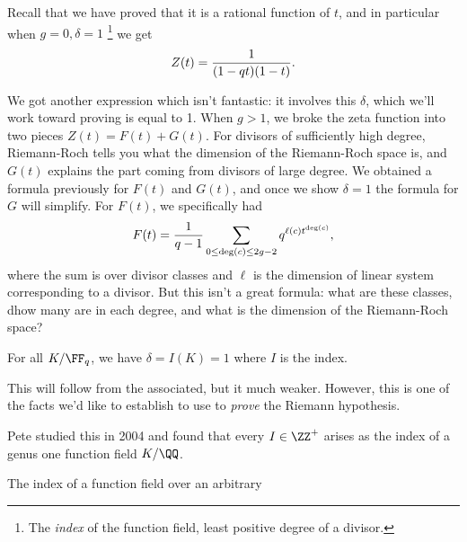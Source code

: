 \begin{remark}

Recall that we have proved that it is a rational function of \(t\), and
in particular when \(g=0, \delta = 1\) \footnote{The \emph{index} of the
  function field, least positive degree of a divisor.} we get
\begin{align*}  
Z(t) = {1 \over (1-qt)(1-t)}
.\end{align*}

We got another expression which isn't fantastic: it involves this
\(\delta\), which we'll work toward proving is equal to 1. When \(g>1\),
we broke the zeta function into two pieces \(Z(t) = F(t) + G(t)\). For
divisors of sufficiently high degree, Riemann-Roch tells you what the
dimension of the Riemann-Roch space is, and \(G(t)\) explains the part
coming from divisors of large degree. We obtained a formula previously
for \(F(t)\) and \(G(t)\), and once we show \(\delta=1\) the formula for
\(G\) will simplify. For \(F(t)\), we specifically had
\begin{align*}  
F(t) = {1\over q-1} \sum_{0\leq \deg(c) \leq 2g-2} q^{\ell(c) t^{\deg(c)}}
,\end{align*} where the sum is over divisor classes and \(\ell\) is the
dimension of linear system corresponding to a divisor. But this isn't a
great formula: what are these classes, dhow many are in each degree, and
what is the dimension of the Riemann-Roch space?

\end{remark}

\begin{theorem}[F.K. Schmidt]

For all \(K/\FF_q\), we have \(\delta = I(K) = 1\) where \(I\) is the
index.

\end{theorem}

This will follow from the associated, but it much weaker. However, this
is one of the facts we'd like to establish to use to \emph{prove} the
Riemann hypothesis.

\begin{remark}

Pete studied this in 2004 and found that every \(I\in \ZZ^+\) arises as
the index of a genus one function field \(K/\QQ\).

\end{remark}

\begin{lemma}[?]

The index of a function field over an arbitrary

\end{lemma}

